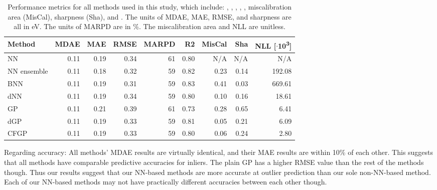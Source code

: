 \documentclass[]{achemso}
\begin{document}
\begin{table}
    \centering
    \begin{tabular}{lrrrrrrrr}
        \toprule
        Method              & \gls{MDAE}    & \gls{MAE} & \gls{RMSE}    & \gls{MARPD}   & \gls{R2}  & MisCal    & Sha   & \gls{NLL} [$\cdot$10\textsuperscript{3}] \\
        \midrule
        \gls{NN}            & 0.11          & 0.19      & 0.34          & 61            & 0.80      & N/A       & N/A   & N/A \\
        \gls{NN} ensemble   & 0.11          & 0.18      & 0.32          & 59            & 0.82      & 0.23      & 0.14  & 192.08 \\
        \gls{BNN}           & 0.11          & 0.19      & 0.31          & 59            & 0.83      & 0.41      & 0.03  & 669.61 \\
        \gls{dNN}           & 0.11          & 0.19      & 0.34          & 59            & 0.80      & 0.10      & 0.16  & 18.61 \\
        \gls{GP}            & 0.11          & 0.21      & 0.39          & 61            & 0.73      & 0.28      & 0.65  & 6.41 \\
        \gls{dGP}           & 0.11          & 0.19      & 0.33          & 59            & 0.81      & 0.05      & 0.21  & 6.09 \\
        \gls{CFGP}          & 0.11          & 0.19      & 0.33          & 59            & 0.80      & 0.06      & 0.24  & 2.80 \\
        \bottomrule
    \end{tabular}
    \caption{Performance metrics for all methods used in this study, which include:
    , , , ,
    , miscalibration area (MisCal), sharpness (Sha), and .
    The units of \gls{MDAE}, \gls{MAE}, \gls{RMSE}, and sharpness are all in \gls{eV}.
    The units of \gls{MARPD} are in \%.
    The miscalibration area and \gls{NLL} are unitless.}\label{tab:results}
\end{table}

Regarding accuracy:  All methods' \gls{MDAE} results are virtually identical, and their \gls{MAE} results are within 10\% of each other.
This suggests that all methods have comparable predictive accuracies for inliers.
The plain \gls{GP} has a higher \gls{RMSE} value than the rest of the methods though.
Thus our results suggest that our \gls{NN}-based methods are more accurate at outlier prediction than our sole non-\gls{NN}-based method.
Each of our \gls{NN}-based methods may not have practically different accuracies between each other though.
\end{document}
